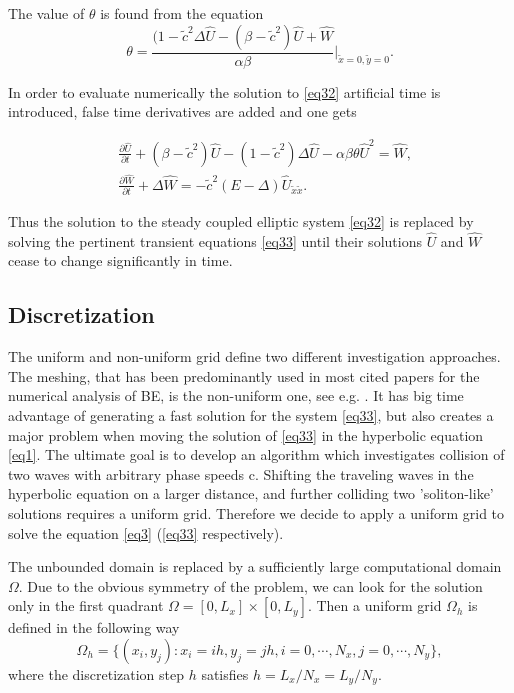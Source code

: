 \documentclass[12pt]{article}
\theoremstyle{theorem}
\theoremstyle{defi}
\begin{document}
The value of $\theta $ is found from the  equation 
\begin{equation}\label{eqtheta}
\theta = \frac{ (1-\tilde c^2 \Delta \widehat{U} - (\beta-\tilde c^2) \widehat{U} +\widehat{W}}{\alpha \beta} |_{\tilde x=0,\tilde y=0} .
\end{equation}

In order to evaluate numerically the solution to \ref{eq32} artificial time is introduced, false time derivatives are added and one gets

\begin{equation}\label{eq33}
\begin{split}
&\frac {\partial \widehat{U}}{\partial t} + (\beta-\tilde c^2) \widehat{U} - (1-\tilde c^2 ) \Delta \widehat{U} - \alpha \beta \theta \widehat{U}^2 = \widehat{W}, \\
&\frac {\partial \widehat{W}}{\partial t} + \Delta \widehat{W} = - \tilde c^2 (E- \Delta) \widehat{U}_{\tilde x \tilde x}. 
\end{split}
\end{equation}

Thus the solution to the steady coupled elliptic system \ref{eq32} is replaced by solving the pertinent transient equations \ref{eq33} until their solutions $\widehat{U}$ and $\widehat{W}$ cease to change significantly in time. 



\subsection{Discretization}

The uniform and non-uniform grid define two different investigation approaches. The meshing, that has been predominantly used in most cited papers for the numerical analysis of BE, is the non-uniform one, see e.g. \cite{ref6}. It has big time advantage of generating a fast solution for the system \ref{eq33}, but also creates a major problem when moving the solution of \ref{eq33} in the hyperbolic equation \ref{eq1}. The ultimate goal is to develop an algorithm which investigates collision of two waves with arbitrary phase speeds c. Shifting the traveling waves in the hyperbolic equation on a larger distance, and further colliding two 'soliton-like' solutions requires a uniform grid. Therefore we decide to apply a uniform grid to solve the equation \ref{eq3} (\ref{eq33} respectively).

The unbounded domain is replaced by a sufficiently large computational domain $\Omega$. Due to the obvious symmetry of the problem, we can look for the solution only in the first quadrant $\Omega = [0,L_x] \times[0,L_y]$. Then a uniform grid $\Omega_h$ is defined in the following way
$$
\Omega_h = \{(x_i,y_j): x_i = ih, y_j = jh, i = 0,\cdots ,N_x, j = 0,\cdots , N_y \},
$$
where the discretization step $h$ satisfies
$ h = L_x/N_x = L_y/N_y$. 
\end{document}
